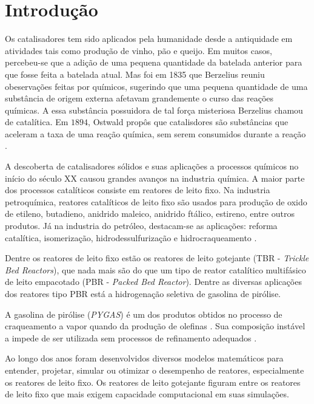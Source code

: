 %
% 
%
\chapter{Introdução} \label{chap:introducao}

Os catalisadores tem sido aplicados pela humanidade desde a antiquidade
em atividades tais como produção de vinho, pão e queijo. Em muitos
casos, percebeu-se que a adição de uma pequena quantidade da batelada anterior
para que fosse feita a batelada atual. Mas foi em 1835 que Berzelius reuniu
obeservações feitas por químicos, sugerindo que uma pequena quantidade de
uma substância de origem externa afetavam grandemente o
curso das reações químicas. A essa substância possuidora de tal força
misteriosa Berzelius chamou de catalítica. Em $1894$, Ostwald propôs que
catalisdores são substâncias que aceleram a taxa de uma reação química, sem
serem consumidos durante a reação \cite{Oyama1988}.

A descoberta de catalisadores sólidos e suas aplicações a processos químicos no
início do século XX causou grandes avanços na industria química. A maior parte
dos processos catalíticos consiste em reatores de leito fixo. Na industria
petroquímica, reatores catalíticos de leito fixo são usados para produção de
oxido de etileno, butadieno, anidrido maleico, anidrido ftálico, estireno,
entre outros produtos. Já na industria do petróleo, destacam-se as aplicações:
reforma catalítica, isomerização, hidrodessulfurização e hidrocraqueamento
\cite{Froment2011}.

Dentre os reatores de leito fixo estão os reatores de leito gotejante
(TBR - \emph{Trickle Bed Reactors}), que nada mais são do que um tipo de reator
catalítico multifásico de leito empacotado (PBR - \emph{Packed Bed Reactor}).
Dentre as diversas aplicações dos reatores tipo PBR está a hidrogenação
seletiva de gasolina de pirólise.

A gasolina de pirólise (\emph{PYGAS}) é um dos produtos obtidos no processo de
craqueamento a vapor quando da produção de olefinas \cite{Cheng1986}. Sua
composição instável a impede de ser utilizada sem processos de refinamento
adequados \cite{Derrien1986}.

Ao longo dos anos foram desenvolvidos diversos modelos matemáticos para
entender, projetar, simular ou otimizar o desempenho de reatores, especialmente
os reatores de leito fixo. Os reatores de leito gotejante figuram entre os
reatores de leito fixo que mais exigem capacidade computacional em suas
simulações. 

